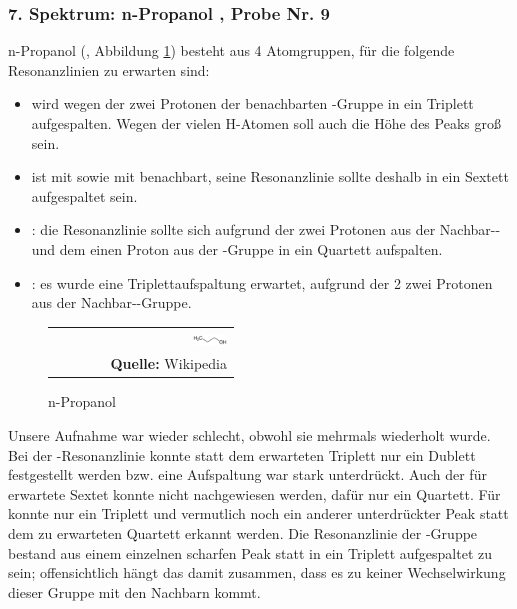 \documentclass[a4paper,titlepage]{scrartcl}
\numberwithin{equation}{section}
\begin{document}
\subsubsection{7. Spektrum: n-Propanol , Probe Nr. 9}
n-Propanol (, Abbildung \ref{fig:npropanol}) besteht aus 4 Atomgruppen, für die folgende Resonanzlinien zu erwarten sind:
\begin{itemize}
\item {} wird wegen der zwei Protonen der benachbarten -Gruppe in ein Triplett aufgespalten. Wegen der vielen H-Atomen soll auch die Höhe des Peaks groß sein.
\item {} ist mit  sowie mit  benachbart, seine Resonanzlinie sollte deshalb in ein Sextett aufgespaltet sein.
\item {}: die Resonanzlinie sollte sich aufgrund der zwei Protonen aus der Nachbar-- und dem einen Proton aus der -Gruppe in ein Quartett aufspalten.
\item {}: es wurde eine Triplettaufspaltung erwartet, aufgrund der 2 zwei Protonen aus der Nachbar--Gruppe.
\end{itemize}
\begin{figure}[H]
	\centering
	\begin{tabular}{@{}r@{}}
		\includegraphics[width=0.2\textwidth]{npropanol.png}\\
	\footnotesize\sffamily\textbf{Quelle:} Wikipedia \cite{wiki:npropanol}
	\end{tabular}
	\caption{n-Propanol }
    \label{fig:npropanol}
\end{figure}
Unsere Aufnahme war wieder schlecht, obwohl sie mehrmals wiederholt wurde. Bei der -Resonanzlinie konnte statt dem erwarteten Triplett nur ein Dublett festgestellt werden bzw. eine Aufspaltung war stark unterdrückt. Auch der für  erwartete Sextet konnte nicht nachgewiesen werden, dafür nur ein Quartett. Für  konnte nur ein Triplett und vermutlich noch ein anderer unterdrückter Peak statt dem zu erwarteten Quartett erkannt werden. Die Resonanzlinie der -Gruppe bestand aus einem einzelnen scharfen Peak statt in ein Triplett aufgespaltet zu sein; offensichtlich hängt das damit zusammen, dass es zu keiner Wechselwirkung dieser Gruppe mit den Nachbarn kommt.\\ \\
\end{document}
